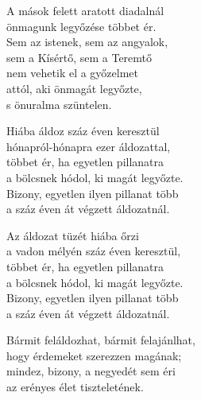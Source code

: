 \begin{dhpverse}

 A mások felett aratott diadalnál\\
önmagunk legyőzése többet ér.\\
Sem az istenek, sem az angyalok,\\
sem a Kísértő, sem a Teremtő\\
nem vehetik el a győzelmet\\
attól, aki önmagát legyőzte,\\
s önuralma szüntelen.

 Hiába áldoz száz éven keresztül\\
hónapról-hónapra ezer áldozattal,\\
többet ér, ha egyetlen pillanatra\\
a bölcsnek hódol, ki magát legyőzte.\\
Bizony, egyetlen ilyen pillanat több\\
a száz éven át végzett áldozatnál.

 Az áldozat tüzét hiába őrzi\\
a vadon mélyén száz éven keresztül,\\
többet ér, ha egyetlen pillanatra\\
a bölcsnek hódol, ki magát legyőzte.\\
Bizony, egyetlen ilyen pillanat több\\
a száz éven át végzett áldozatnál.

 Bármit feláldozhat, bármit felajánlhat,\\
hogy érdemeket szerezzen magának;\\
mindez, bizony, a negyedét sem éri\\
az erényes élet tiszteletének.

\end{dhpverse}
\newpage
